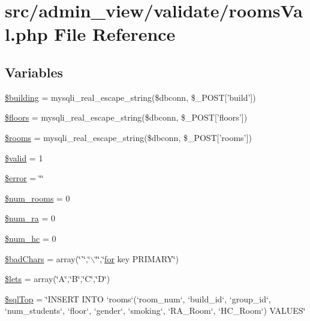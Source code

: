 \hypertarget{roomsVal_8php}{\section{src/admin\-\_\-view/validate/rooms\-Val.php \-File \-Reference}
\label{roomsVal_8php}
}
\subsection*{\-Variables}
\begin{DoxyCompactItemize}
\item 
\hyperlink{roomsVal_8php_a903ab1c50249715a442ce81e6d5ba775}{\$building} = mysqli\-\_\-real\-\_\-escape\-\_\-string(\$dbconn, \$\-\_\-\-P\-O\-S\-T\mbox{[}'build'\mbox{]})
\item 
\hyperlink{roomsVal_8php_aa0d74edae4412a4ad5a1b0537ada5ecc}{\$floors} = mysqli\-\_\-real\-\_\-escape\-\_\-string(\$dbconn, \$\-\_\-\-P\-O\-S\-T\mbox{[}'floors'\mbox{]})
\item 
\hyperlink{roomsVal_8php_a7885060478f8025f87d356f715f7b776}{\$rooms} = mysqli\-\_\-real\-\_\-escape\-\_\-string(\$dbconn, \$\-\_\-\-P\-O\-S\-T\mbox{[}'rooms'\mbox{]})
\item 
\hyperlink{roomsVal_8php_a0587674d27d00ef497e08e53ccf45bbb}{\$valid} = 1
\item 
\hyperlink{roomsVal_8php_aeba2ab722cedda53dbb7ec1a59f45550}{\$error} = \char`\"{}\char`\"{}
\item 
\hyperlink{roomsVal_8php_ad51cf907141b35051a8d4123b3e7e259}{\$num\-\_\-rooms} = 0
\item 
\hyperlink{roomsVal_8php_aaf1cd7ce3153edff129df3a57ab81c2f}{\$num\-\_\-ra} = 0
\item 
\hyperlink{roomsVal_8php_a0676c3aab4512e850c0778fdc42ea183}{\$num\-\_\-hc} = 0
\item 
\hyperlink{roomsVal_8php_a2cca3c3b2bea27a3104265f7cc345bcb}{\$bad\-Chars} = array(\char`\"{}'\char`\"{},\char`\"{}$\backslash$\char`\"{}\char`\"{},\char`\"{}\hyperlink{sendMail_8php_a97c5d50455f68774b384f988b990d00f}{for} key \-P\-R\-I\-M\-A\-R\-Y\char`\"{})
\item 
\hyperlink{roomsVal_8php_a628d739f2a9b4e8ad7b45417ca5b0edd}{\$lets} = array(\char`\"{}\-A\char`\"{},\char`\"{}\-B\char`\"{},\char`\"{}\-C\char`\"{},\char`\"{}\-D\char`\"{})
\item 
\hyperlink{roomsVal_8php_a1ed0735728ed423fcc71363224bf1b96}{\$sql\-Top} = \char`\"{}\-I\-N\-S\-E\-R\-T \-I\-N\-T\-O `rooms`(`room\-\_\-num`, `build\-\_\-id`, `group\-\_\-id`, `num\-\_\-students`, `floor`, `gender`, `smoking`, `\-R\-A\-\_\-\-Room`, `\-H\-C\-\_\-\-Room`) \-V\-A\-L\-U\-E\-S\char`\"{}

\end{DoxyCompactItemize}
